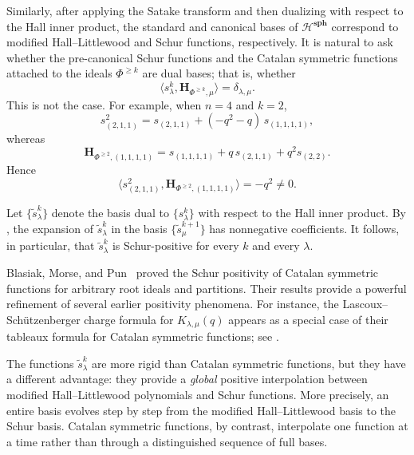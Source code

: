 Similarly, after applying the Satake transform and then dualizing with respect to the Hall inner product, the standard and canonical bases of $\mathcal{H}^{\mathbf{sph}}$ correspond to modified Hall--Littlewood and Schur functions, respectively. It is natural to ask whether the pre-canonical Schur functions and the Catalan symmetric functions attached to the ideals $\Phi^{\geq k}$ are dual bases; that is, whether
\begin{equation}
    \langle s_{\lambda}^k , \mathbf{H}_{\Phi^{\ge k},\mu} \rangle = \delta_{\lambda,\mu}.
\end{equation}
This is not the case. For example, when $n=4$ and $k=2$,
\begin{equation}
    s^2_{(2,1,1)} 
      = s_{(2,1,1)} + (-q^{2}-q)\, s_{(1,1,1,1)},
\end{equation}
whereas
\begin{equation}
    \mathbf{H}_{\Phi^{\ge 2}, (1,1,1,1)} 
      = s_{(1,1,1,1)} + q\,s_{(2,1,1)} + q^2 s_{(2,2)}.
\end{equation}
Hence
\begin{equation}
  \langle s^2_{(2,1,1)} , \mathbf{H}_{\Phi^{\ge 2}, (1,1,1,1)} \rangle
  = -q^{2} \neq 0.
\end{equation}

Let $\{\tilde{s}_{\lambda}^{k}\}$ denote the basis dual to $\{s_{\lambda}^k\}$ with respect to the Hall inner product. By , the expansion of $\tilde{s}_{\lambda}^{k}$ in the basis $\{\tilde{s}_{\mu}^{k+1}\}$ has nonnegative coefficients. It follows, in particular, that $\tilde{s}_{\lambda}^{k}$ is Schur-positive for every $k$ and every $\lambda$.

Blasiak, Morse, and Pun~\cite{blasiak2024demazure} proved the Schur positivity of Catalan symmetric functions for arbitrary root ideals and partitions. Their results provide a powerful refinement of several earlier positivity phenomena. For instance, the Lascoux--Sch\"utzenberger charge formula for $K_{\lambda,\mu}(q)$ appears as a special case of their tableaux formula for Catalan symmetric functions; see \cite[Theorem~2.18]{blasiak2024demazure}.

The functions $\tilde{s}_{\lambda}^{k}$ are more rigid than Catalan symmetric functions, but they have a different advantage: they provide a \emph{global} positive interpolation between modified Hall--Littlewood polynomials and Schur functions. More precisely, an entire basis evolves step by step from the modified Hall--Littlewood basis to the Schur basis. Catalan symmetric functions, by contrast, interpolate one function at a time rather than through a distinguished sequence of full bases.

